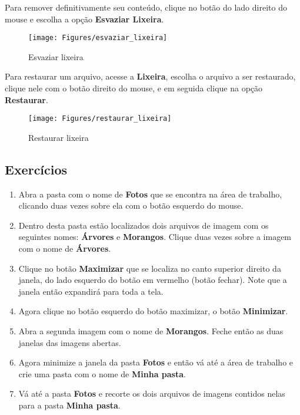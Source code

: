 \documentclass[hidelinks,12pt]{article}
\begin{document}
Para remover definitivamente seu conteúdo, clique no botão do lado direito do mouse e escolha a opção {\bf Esvaziar Lixeira}.

\begin{figure}[!h]
	\centering
	\texttt{[image: Figures/esvaziar\_lixeira]}
	\caption{Esvaziar lixeira}
	\label{fig:esvaziar_lixeira}
\end{figure}

Para restaurar um arquivo, acesse a {\bf Lixeira}, escolha o arquivo a ser restaurado, clique nele com o botão direito do mouse, e em seguida clique na opção {\bf Restaurar}.

\begin{figure}[!h]
	\centering
	\texttt{[image: Figures/restaurar\_lixeira]}
	\caption{Restaurar lixeira}
	\label{fig: restaurar_lixeira}
\end{figure}

\subsection{Exercícios}

\begin{enumerate}
	\item Abra a pasta com o nome de {\bf Fotos} que se encontra na área de trabalho, clicando duas vezes sobre ela com o botão esquerdo do mouse.


	\item Dentro desta pasta estão localizados dois arquivos de imagem com os seguintes nomes: {\bf Árvores} e {\bf Morangos}. Clique duas vezes sobre a imagem com o nome de {\bf Árvores}.

	\item Clique no botão {\bf Maximizar} que se localiza no canto superior direito da janela, do lado esquerdo do botão em vermelho (botão fechar). Note que a janela então expandirá para toda a tela.

	\item Agora clique no botão esquerdo do botão maximizar, o botão {\bf Minimizar}.

	\item Abra a segunda imagem com o nome de {\bf Morangos}. Feche então as duas janelas das imagens abertas.

	\item Agora minimize a janela da pasta {\bf Fotos} e então vá até a área de trabalho e crie uma pasta com o nome de {\bf Minha pasta}.

	\item Vá até a pasta {\bf Fotos} e recorte os dois arquivos de imagens contidos nelas para a pasta {\bf Minha pasta}.

\end{enumerate}
\end{document}
